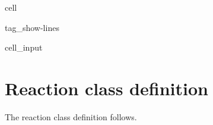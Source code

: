 \documentclass[letterpaper,10pt,english]{jupyterBook}
\begin{document}
\begin{sphinxuseclass}{cell}
\begin{sphinxuseclass}{tag_show-lines}
\begin{sphinxVerbatimInput}
\begin{sphinxuseclass}{cell_input}
\begin{sphinxVerbatim}[commandchars=\\\{\}]
           
              
           
              
         
              
         
\end{sphinxVerbatim}

\end{sphinxuseclass}\end{sphinxVerbatimInput}

\end{sphinxuseclass}
\end{sphinxuseclass}

\chapter{Reaction class definition}
\label{\detokenize{2_Temperature/_2T_Reaction_class_definition:reaction-class-definition}}
\sphinxAtStartPar
The reaction class definition follows.
\end{document}
